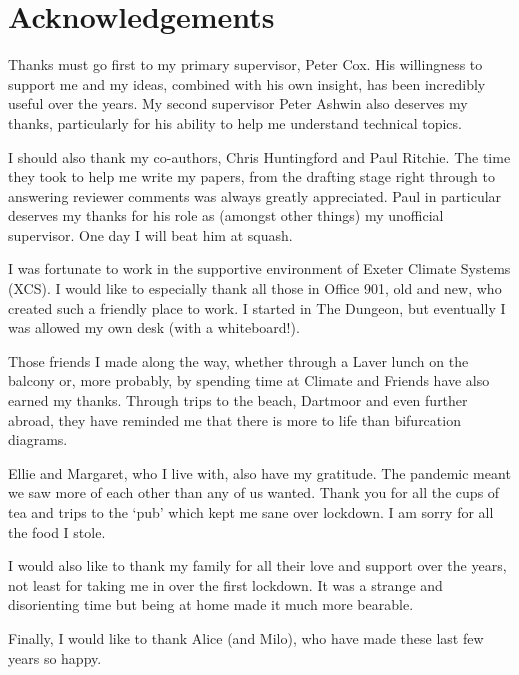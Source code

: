 \chapter{Acknowledgements}

Thanks must go first to my primary supervisor, Peter Cox. His willingness to support me and my ideas, combined with his own insight,
has been incredibly useful over the years. My second supervisor Peter Ashwin also deserves my thanks,
particularly for his ability to help me understand technical topics.

I should also thank my co-authors, Chris Huntingford and Paul Ritchie. The time they took to help me
write my papers, from the drafting stage right through to answering reviewer comments was always greatly appreciated. Paul
in particular deserves my thanks for his role as (amongst other things) my unofficial supervisor. One day I will beat him at squash.

I was fortunate to work in the supportive environment of Exeter Climate Systems (XCS). I would like to especially thank 
all those in Office 901, old and new, who created such a friendly place to work. I started in The Dungeon,
but eventually I was allowed my own desk (with a whiteboard!).

Those friends I made along the way, whether through a Laver lunch on the balcony or, more probably, by spending time at Climate and
Friends have also earned my thanks. Through trips to the beach, Dartmoor and even further abroad, they have reminded me that there is more to life
than bifurcation diagrams.

Ellie and Margaret, who I live with, also have my gratitude. The pandemic meant we saw more of each other than any of us wanted.
Thank you for all the cups of tea and trips to the `pub' which kept me sane over lockdown. I am sorry for
all the food I stole.

I would also like to thank my family for all their love and support over the years, not least for taking me in over the first lockdown.
It was a strange and disorienting time but being at home made it much more bearable.

Finally, I would like to thank Alice (and Milo), who have made these last few years so happy.